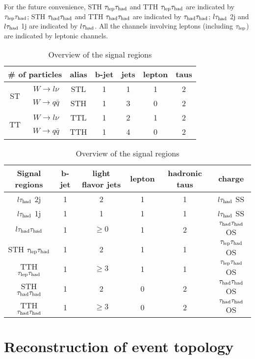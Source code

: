 For the future convenience, STH $\tau_\text{lep}{}\tau_\text{had}$ and TTH $\tau_\text{lep}{}\tau_\text{had}$ are indicated by $\tau_\text{lep}{}\tau_\text{had}$; STH $\tau_\text{had}{}\tau_\text{had}$ and TTH $\tau_\text{had}{}\tau_\text{had}$ are indicated by $\tau_\text{had}{}\tau_\text{had}$; $l\tau_\text{had}$ 2j and $l\tau_\text{had}$ 1j are indicated by $l\tau_\text{had}$. All the channels involving leptons (including $\tau_\text{lep}$) are indicated by leptonic channels.

\begin{table}
\footnotesize
\centering
\caption{Overview of the final states of signal events}
\label{tab:signalevents}
\begin{tabular}[h]{c|c|c|c|c|c|c}
\hline \hline

\multicolumn{2}{c|}{\# of particles}	& alias & b-jet & jets & lepton & taus\\ \hline
\multirow{2}{*}{ST}	& $W\to l\nu$		& STL   & 1	    & 1    & 1      & 2   \\ \cline{2-7}
					& $W\to q\bar{q}$	& STH   & 1	    & 3    & 0      & 2   \\ \hline
\multirow{2}{*}{TT}	& $W\to l\nu$		& TTL   & 1	    & 2    & 1      & 2   \\ \cline{2-7}
					& $W\to q\bar{q}$	& TTH   & 1	    & 4    & 0      & 2   \\ \hline
\end{tabular}
\footnotesize
\centering
\caption{Overview of the signal regions}
\label{tab:signalregions}
\begin{tabular}[h]{c|c|c|c|c|c}
\hline \hline
Signal regions & b-jet & light flavor jets	& lepton & hadronic taus & charge\\ \hline
$l\tau_\text{had}$ 2j  & 1     & 2					& 1      & 1			 & $l\tau_\text{had}$ SS\\ \hline
$l\tau_\text{had}$ 1j  & 1     & 1					& 1      & 1			 & $l\tau_\text{had}$ SS\\ \hline
$l\tau_\text{had}{}\tau_\text{had}$	   & 1     & $\ge0$ 			& 1      & 2             & $\tau_\text{had}{}\tau_\text{had}$ OS\\ \hline
STH $\tau_\text{lep}{}\tau_\text{had}$   & 1     & 2      			& 1      & 1             & $\tau_\text{lep}{}\tau_\text{had}$ OS\\ \hline
TTH $\tau_\text{lep}{}\tau_\text{had}$   & 1     & $\ge3$ 			& 1      & 1             & $\tau_\text{lep}{}\tau_\text{had}$ OS\\ \hline
STH $\tau_\text{had}{}\tau_\text{had}$ & 1     & 2      			& 0      & 2             & $\tau_\text{had}{}\tau_\text{had}$ OS\\ \hline
TTH $\tau_\text{had}{}\tau_\text{had}$ & 1     & $\ge3$ 			& 0      & 2             & $\tau_\text{had}{}\tau_\text{had}$ OS\\ \hline
\end{tabular}
\end{table}

\section{Reconstruction of event topology}
\label{sec:reconstruction}

